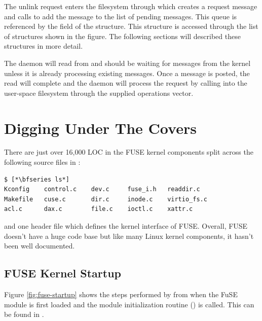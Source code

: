 The unlink request enters the  filesystem through  which creates a  request message and calls  to add the message to the list of pending messages. This queue is referenced by the  field of the  structure. This structure is accessed through the list of structures shown in the figure. The following sections will described these structures in more detail. 

The  daemon will read from  and should be waiting for messages from the kernel unless it is already processing existing messages. Once a message is posted, the read will complete and the daemon will process the request by calling into the user-space filesystem through the supplied operations vector.


\section{Digging Under The Covers}

There are just over 16,000 LOC in the FUSE kernel components split across the following source files in :

\begin{lstlisting}
$ [*\bfseries ls*]
Kconfig    control.c	dev.c	  fuse_i.h   readdir.c
Makefile   cuse.c       dir.c     inode.c    virtio_fs.c
acl.c      dax.c        file.c    ioctl.c    xattr.c
\end{lstlisting}

\noindent
and one header file  which defines the kernel interface of FUSE. Overall, FUSE doesn't have a huge code base but like many Linux kernel components, it hasn't been well documented.


\subsection{FUSE Kernel Startup}

Figure \ref{fig:fuse-startup} shows the steps performed by  from when the FuSE module is first loaded and the module initialization routine () is called. This can be found in .

